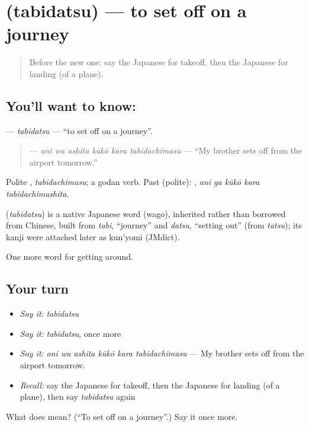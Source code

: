 \section[\texorpdfstring{\ja{たびだつ} (tabidatsu)}{たびだつ (tabidatsu)}]{ (tabidatsu) — to set off on a journey}

\label{lesson:JA-C384-tabidatsu}



\begin{quote}
Before the new one: say the Japanese for takeoff, then the Japanese for landing (of a plane).
\end{quote}

\subsection*{You'll want to know: }
\textbf{} — \emph{tabidatsu} — \textquotedblleft{}to set off on a journey\textquotedblright{}.

\begin{quote}
\textbf{   } — \emph{ani wa ashita kūkō kara tabidachimasu} — \textquotedblleft{}My brother sets off from the airport tomorrow.\textquotedblright{}
\end{quote}

Polite \textbf{}, \emph{tabidachimasu}; a godan verb. Past (polite): \textbf{  }, \emph{ani ga kūkō kara tabidachimashita}.

\begin{cousinweb}
\textbf{} (\emph{tabidatsu}) is a native Japanese word (wago), inherited rather than borrowed from Chinese, built from \emph{tabi}, \textquotedblleft{}journey\textquotedblright{} and \emph{datsu}, \textquotedblleft{}setting out\textquotedblright{} (from \emph{tatsu}); its kanji were attached later as kun'yomi (JMdict).
\end{cousinweb}

\begin{grammarlens}[title={What you've built}]
One more word for getting around.
\end{grammarlens}

\subsection*{Your turn}
\begin{itemize}
\raggedright
  \item \emph{Say it:} \emph{tabidatsu}
  \item \emph{Say it:} \emph{tabidatsu}, once more
  \item \emph{Say it:} \emph{ani wa ashita kūkō kara tabidachimasu} — My brother sets off from the airport tomorrow.
  \item \emph{Recall:} say the Japanese for takeoff, then the Japanese for landing (of a plane), then say \emph{tabidatsu} again
\end{itemize}

\begin{tcolorbox}[breakable,colback=teal!4,colframe=teal!35!black,title={Before you move on}]
What does  mean? (\textquotedblleft{}To set off on a journey\textquotedblright{}.) Say it once more.
\end{tcolorbox}
